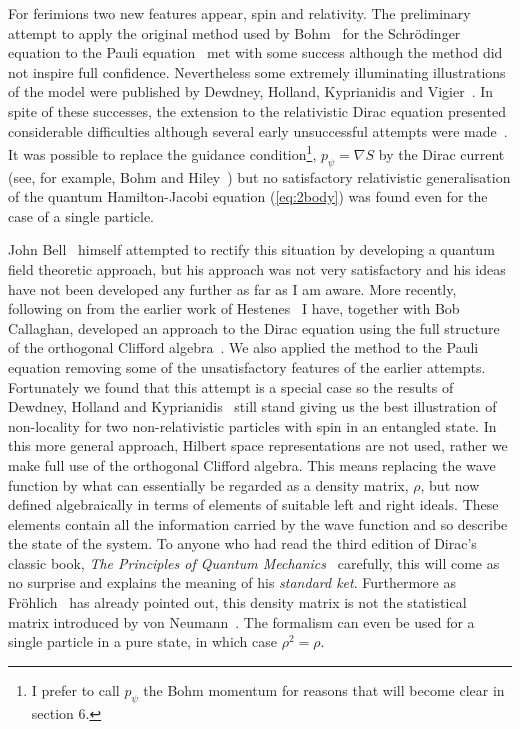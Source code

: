 \documentclass[12pt]{article}
\begin{document}
For ferimions two new features appear, spin and relativity.  The preliminary attempt to apply the original method used by Bohm~\cite{db52} for the Schr\"{o}dinger equation to the Pauli equation~\cite{bst55} met with some success although the method did not inspire full confidence. Nevertheless some extremely illuminating illustrations of the model were published by 
Dewdney, Holland, Kyprianidis and Vigier~\cite{cdphak87, cdphak88}. 
In spite of these successes, the extension to the relativistic Dirac equation presented considerable difficulties although several early unsuccessful attempts were made~\cite{db62, ldb60, ph95, dbbh93}.  It was possible to replace the guidance condition\footnote{I prefer to call $p_\psi$ the Bohm momentum for reasons that will become clear in section 6.}, $p_\psi=\nabla S$ by the Dirac current (see, for example, Bohm and Hiley~\cite{dbbh93}) but no satisfactory relativistic generalisation of the quantum Hamilton-Jacobi equation (\ref{eq:2body}) was found even for the case of a single particle.

John Bell~\cite{jb87} himself attempted to rectify this situation by developing a quantum field theoretic approach, 
but his approach was not very satisfactory and his ideas have not been developed any further as far as I am aware. More recently, following on from the earlier work of Hestenes~\cite{dh03}
 I have, together with Bob Callaghan, developed an  approach to the Dirac equation using the full structure of the orthogonal Clifford algebra~\cite{bhbc12, bhbc11}.  We also applied the method to the Pauli equation removing some of the unsatisfactory features of the earlier attempts.  Fortunately we found that this attempt is a special case  so the results of Dewdney, Holland and Kyprianidis~\cite{cdphak87} still stand giving us the best illustration of non-locality for two non-relativistic particles with spin in an entangled state.
In this more general approach,  Hilbert space representations are not used, rather we make full use of the orthogonal Clifford algebra.  This means replacing the wave function by what can  essentially be regarded as a density matrix, $\rho$, but now defined algebraically in terms of elements of suitable left and right ideals. These elements contain all the information carried by the wave function and so describe the state of the system.  To anyone who had read the third edition of Dirac's classic book, {\em The Principles of Quantum Mechanics}~\cite{pd47} 
carefully, this will come as no surprise and explains the meaning of his {\em standard ket}.  Furthermore as Fr\"{o}hlich~\cite{hf67} has already pointed out, this density matrix is not the statistical matrix introduced by von Neumann~\cite{vn55}.
The formalism can even be used for a single particle in a pure state, in which   case $\rho^2=\rho$.  
\end{document}
